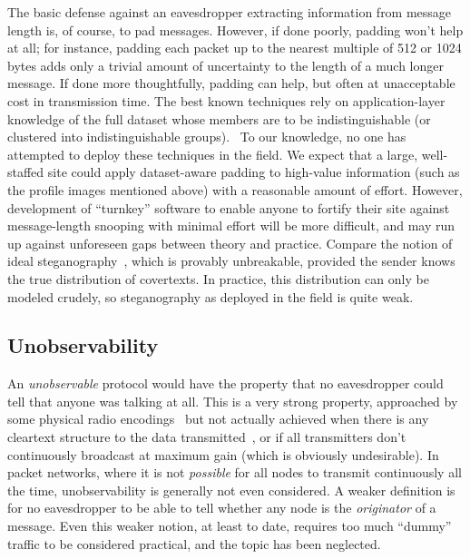 \documentclass[oneside,tinymargin]{zarticle}
\begin{document}
\begin{multicols}{2}
The basic defense against an eavesdropper extracting information from
message length is, of course, to pad messages.  However, if done
poorly, padding won't help at all; for instance, padding each packet
up to the nearest multiple of 512 or 1024 bytes adds only a trivial
amount of uncertainty to the length of a much longer message.  If done
more thoughtfully, padding can help, but often at unacceptable cost in
transmission time.  The best known techniques rely on
application-layer knowledge of the full dataset whose members are to
be indistinguishable (or clustered into indistinguishable
groups).~\cite{chen2010side, mather2012pinpointing,
  backes2013sidechannel} To our knowledge, no one has attempted to
deploy these techniques in the field.  We expect that a large,
well-staffed site could apply dataset-aware padding to high-value
information (such as the profile images mentioned above) with a
reasonable amount of effort.  However, development of “turnkey”
software to enable anyone to fortify their site against message-length
snooping with minimal effort will be more difficult, and may run up
against unforeseen gaps between theory and practice.  Compare the
notion of ideal steganography~\cite{hopper2009provably}, which is
provably unbreakable, provided the sender knows the true distribution
of covertexts.  In practice, this distribution can only be modeled
crudely, so steganography as deployed in the field is quite
weak.~\cite{boehme2010steganalysis}

\subsection{Unobservability}

An \emph{unobservable} protocol would have the property that no
eavesdropper could tell that anyone was talking at all.  This is a
very strong property, approached by some physical radio
encodings~\cite{pickholtz1982theory, yu2007dsss} but not actually
achieved when there is any cleartext structure to the data
transmitted~\cite{jia2013blind}, or if all transmitters don't
continuously broadcast at maximum gain (which is obviously
undesirable).  In packet networks, where it is not \emph{possible} for
all nodes to transmit continuously all the time, unobservability is
generally not even considered.  A weaker definition is for no
eavesdropper to be able to tell whether any node is the
\emph{originator} of a message.  Even this weaker notion, at least to
date, requires too much “dummy” traffic to be considered practical,
and the topic has been neglected.


\end{multicols}
\end{document}
